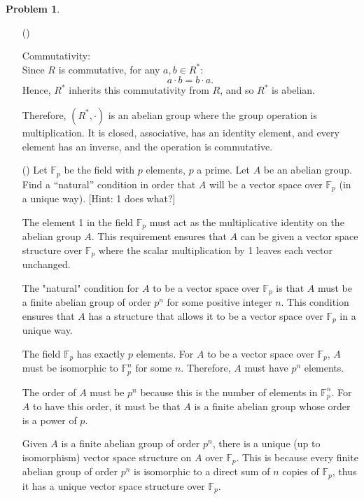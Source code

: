 \documentclass[12pt]{article}
\theoremstyle{definition}
\newtheorem{problem}{Problem}
\newcounter{subq}[problem]
\newenvironment{subproblem}
{\refstepcounter{subq} \begin{itemize} \item[(\alph{subq})]}
{\end{itemize} \medskip}
\begin{document}
\begin{problem}
\begin{subproblem}
\begin{solution}
            Commutativity:\\
            Since \( R \) is commutative, for any \( a, b \in R^* \):
            \[
            a \cdot b = b \cdot a.
            \]
            Hence, \( R^* \) inherits this commutativity from \( R \), and so \( R^* \) is abelian.
    
            Therefore, \( (R^*, \cdot) \) is an abelian group where the group operation is multiplication. It is closed, associative, has an identity element, and every element has an inverse, and the operation is commutative.
        \end{solution}
    \end{subproblem}

    \begin{subproblem}
        Let $\mathbb{F}_p$ be the field with $p$ elements, $p$ a prime. Let $A$ be an abelian group.
        Find a ``natural'' condition in order that $A$ will be a vector space over $\mathbb{F}_p$ (in a
        unique way). [Hint: 1 does what?]

        \begin{solution}
            The element 1 in the field $\mathbb{F}_p$ must act as the multiplicative identity on the abelian group $A$. 
            This requirement ensures that $A$ can be given a vector space structure over $\mathbb{F}_p$ where the scalar multiplication by 1 leaves each vector unchanged. 

            The "natural" condition for \( A \) to be a vector space over \(\mathbb{F}_p\) is that \( A \) must be a finite abelian group of order \( p^n \) for some positive integer \( n \). This condition ensures that \( A \) has a structure that allows it to be a vector space over \(\mathbb{F}_p\) in a unique way. 

            The field \(\mathbb{F}_p\) has exactly \( p \) elements. For \( A \) to be a vector space over \(\mathbb{F}_p\), \( A \) must be isomorphic to \(\mathbb{F}_p^n\) for some \( n \). Therefore, \( A \) must have \( p^n \) elements.

            The order of \( A \) must be \( p^n \) because this is the number of elements in \( \mathbb{F}_p^n \). For \( A \) to have this order, it must be that \( A \) is a finite abelian group whose order is a power of \( p \).

            Given \( A \) is a finite abelian group of order \( p^n \), there is a unique (up to isomorphism) vector space structure on \( A \) over \(\mathbb{F}_p\). This is because every finite abelian group of order \( p^n \) is isomorphic to a direct sum of \( n \) copies of \(\mathbb{F}_p\), thus it has a unique vector space structure over \(\mathbb{F}_p\).


\end{solution}
\end{subproblem}
\end{problem}
\end{document}
